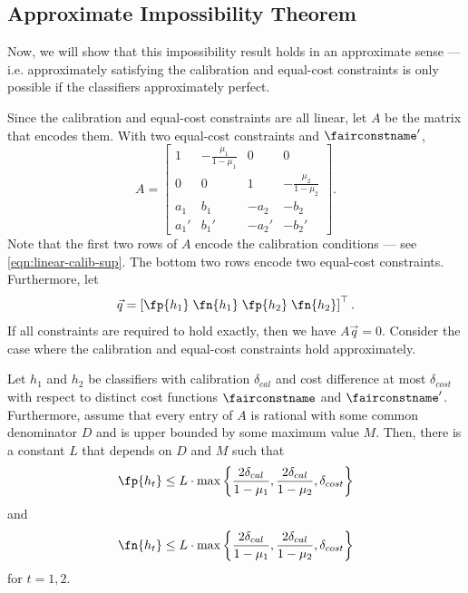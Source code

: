 \subsection{Approximate Impossibility Theorem}

Now, we will show that this impossibility result holds in an approximate sense --- i.e.
approximately satisfying the calibration and equal-cost constraints is only possible
if the classifiers approximately perfect.

Since the calibration and equal-cost constraints are all linear, let $A$ be the
matrix that encodes them. With two equal-cost constraints
\fairconstname{} and
$\fairconstname'$,
\[
  A = \begin{bmatrix}
    1 &-\frac{\mu_1}{1-\mu_1} & 0 & 0 \\
    0 & 0 & 1 &-\frac{\mu_2}{1-\mu_2} \\
    a_1 & b_1 & -a_2 & -b_2 \\
    a_1' & b_1' & -a_2' & -b_2'
  \end{bmatrix}.
\]
Note that the first two rows of $A$ encode the calibration conditions --- see \eqref{eqn:linear-calib-sup}.
The bottom two rows encode two equal-cost constraints.
Furthermore, let
\[
  \vec{q} = \left[\fp{h_1} \; \fn{h_1} \; \fp{h_2} \; \fn{h_2}\right]^\top.
\]
If all constraints are required to hold exactly, then we have $A \vec{q} = 0$.
Consider the case where the calibration and equal-cost constraints hold
approximately.
\begin{thm} \label{thm:approx-impossibility}
  Let $h_1$ and $h_2$ be classifiers with calibration $\delta_{cal}$ and
  cost difference at most $\delta_{cost}$ with respect to distinct cost functions
  $\fairconstname$ and $\fairconstname'$. Furthermore, assume that every entry
  of $A$ is rational with some common denominator $D$ and is upper bounded by
  some maximum value $M$. Then, there is a constant $L$ that depends on $D$ and
  $M$ such that
  \[
    \fp{h_t} \le L \cdot \max\left\{\frac{2\delta_{cal}}{1-\mu_1},
    \frac{2\delta_{cal}}{1-\mu_2}, \delta_{cost}\right\}
  \]
  and
  \[
    \fn{h_t} \le L \cdot \max\left\{\frac{2\delta_{cal}}{1-\mu_1},
    \frac{2\delta_{cal}}{1-\mu_2}, \delta_{cost}\right\}
  \]
  for $t = 1,2$.
  \label{thm:approx}
\end{thm}

